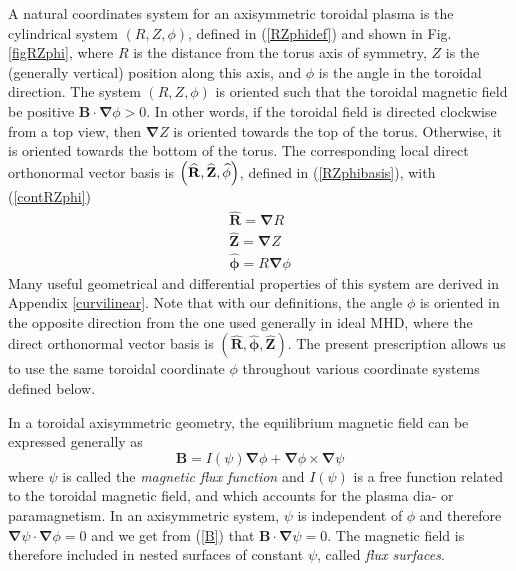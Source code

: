 A natural coordinates system for an axisymmetric toroidal plasma is the
cylindrical system $\left( R,Z,\phi\right) $, defined in (\ref{RZphidef})
and shown in Fig. \ref{figRZphi}, where $R$ is the distance from the torus
axis of symmetry, $Z$ is the (generally vertical) position along this axis,
and $\phi$ is the angle in the toroidal direction. The system $\left(
R,Z,\phi\right) $ is oriented such that the toroidal magnetic field be
positive $\mathbf{B}\cdot\mathbf{\nabla}\phi>0$. In other words, if the
toroidal field is directed clockwise from a top view, then $\mathbf{\nabla}Z$
is oriented towards the top of the torus. Otherwise, it is oriented towards
the bottom of the torus. The corresponding local direct orthonormal vector
basis is $\left( \widehat{\mathbf{R}},\widehat{\mathbf{Z}},\widehat {\mathbf{%
\phi}}\right) $, defined in (\ref{RZphibasis}), with (\ref{contRZphi})%
\begin{equation}
\begin{array}{l}
\widehat{\mathbf{R}}=\mathbf{\nabla}R \\ 
\widehat{\mathbf{Z}}=\mathbf{\nabla}Z \\ 
\widehat{\mathbf{\phi}}=R\mathbf{\nabla}\phi%
\end{array}
\label{RZphi}
\end{equation}
Many useful geometrical and differential properties of this system are
derived in Appendix \ref{curvilinear}. Note that with our definitions, the
angle $\phi$ is oriented in the opposite direction from the one used
generally in ideal MHD, where the direct orthonormal vector basis is $\left( 
\widehat{\mathbf{R}},\widehat{\mathbf{\phi}},\widehat{\mathbf{Z}}\right) $.
The present prescription allows us to use the same toroidal coordinate $\phi$
throughout various coordinate systems defined below.

In a toroidal axisymmetric geometry, the equilibrium magnetic field can be
expressed generally as \cite{haz91b1} 
\begin{equation}
\mathbf{B}=I\left( \psi\right) \mathbf{\nabla}\phi+\mathbf{\nabla}\phi \times%
\mathbf{\nabla}\psi   \label{B}
\end{equation}
where $\psi$ is called the \textit{magnetic flux function} and $I\left(
\psi\right) $ is a free function related to the toroidal magnetic field, and
which accounts for the plasma dia- or paramagnetism. In an axisymmetric
system, $\psi$ is independent of $\phi$ and therefore $\mathbf{\nabla}%
\psi\cdot\mathbf{\nabla}\phi=0$ and we get from (\ref{B}) that $\mathbf{B}%
\cdot\mathbf{\nabla}\psi=0$. The magnetic field is therefore included in
nested surfaces of constant $\psi$, called \textit{flux surfaces}.

